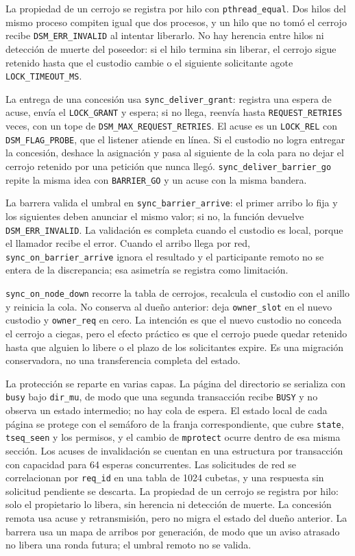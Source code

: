 \documentclass[11pt,spanish]{article}
\begin{document}
La propiedad de un cerrojo se registra por hilo con \texttt{pthread\_equal}. Dos hilos del mismo proceso compiten igual que dos procesos, y un hilo que no tomó el cerrojo recibe \texttt{DSM\_ERR\_INVALID} al intentar liberarlo. No hay herencia entre hilos ni detección de muerte del poseedor: si el hilo termina sin liberar, el cerrojo sigue retenido hasta que el custodio cambie o el siguiente solicitante agote \texttt{LOCK\_TIMEOUT\_MS}.

La entrega de una concesión usa \texttt{sync\_deliver\_grant}: registra una espera de acuse, envía el \texttt{LOCK\_GRANT} y espera; si no llega, reenvía hasta \texttt{REQUEST\_RETRIES} veces, con un tope de \texttt{DSM\_MAX\_REQUEST\_RETRIES}. El acuse es un \texttt{LOCK\_REL} con \texttt{DSM\_FLAG\_PROBE}, que el listener atiende en línea. Si el custodio no logra entregar la concesión, deshace la asignación y pasa al siguiente de la cola para no dejar el cerrojo retenido por una petición que nunca llegó. \texttt{sync\_deliver\_barrier\_go} repite la misma idea con \texttt{BARRIER\_GO} y un acuse con la misma bandera.

La barrera valida el umbral en \texttt{sync\_barrier\_arrive}: el primer arribo lo fija y los siguientes deben anunciar el mismo valor; si no, la función devuelve \texttt{DSM\_ERR\_INVALID}. La validación es completa cuando el custodio es local, porque el llamador recibe el error. Cuando el arribo llega por red, \texttt{sync\_on\_barrier\_arrive} ignora el resultado y el participante remoto no se entera de la discrepancia; esa asimetría se registra como limitación.

\texttt{sync\_on\_node\_down} recorre la tabla de cerrojos, recalcula el custodio con el anillo y reinicia la cola. No conserva al dueño anterior: deja \texttt{owner\_slot} en el nuevo custodio y \texttt{owner\_req} en cero. La intención es que el nuevo custodio no conceda el cerrojo a ciegas, pero el efecto práctico es que el cerrojo puede quedar retenido hasta que alguien lo libere o el plazo de los solicitantes expire. Es una migración conservadora, no una transferencia completa del estado.

La protección se reparte en varias capas. La página del directorio se serializa con \texttt{busy} bajo \texttt{dir\_mu}, de modo que una segunda transacción recibe \texttt{BUSY} y no observa un estado intermedio; no hay cola de espera. El estado local de cada página se protege con el semáforo de la franja correspondiente, que cubre \texttt{state}, \texttt{tseq\_seen} y los permisos, y el cambio de \texttt{mprotect} ocurre dentro de esa misma sección. Los acuses de invalidación se cuentan en una estructura por transacción con capacidad para 64 esperas concurrentes. Las solicitudes de red se correlacionan por \texttt{req\_id} en una tabla de 1024 cubetas, y una respuesta sin solicitud pendiente se descarta. La propiedad de un cerrojo se registra por hilo: solo el propietario lo libera, sin herencia ni detección de muerte. La concesión remota usa acuse y retransmisión, pero no migra el estado del dueño anterior. La barrera usa un mapa de arribos por generación, de modo que un aviso atrasado no libera una ronda futura; el umbral remoto no se valida.
\end{document}
